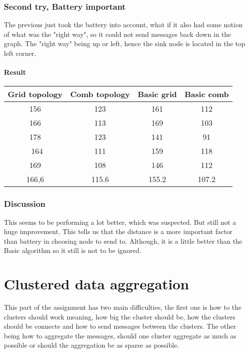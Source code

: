 \documentclass{article}
\begin{document}
\section{Second try, Battery important}
  The previous just took the battery into account, what if it also had
  some notion of what was the "right way", so it could not send messages
  back down in the graph. The "right way" being up or left, hence the sink
  node is located in the top left corner.
  \subsection{Result}
    \begin{tabular}{c|c||c|c}
      Grid topology & Comb topology & Basic grid & Basic comb\\
      \hline
      \hline
      156 & 123 & 161 & 112\\
      166 & 113 & 169 & 103\\
      178 & 123 & 141 & 91\\\
      164 & 111 & 159 & 118\\
      169 & 108 & 146 & 112\\
      \hline
      166,6&115.6&155.2&107.2\\
    \end{tabular}
    \section{Discussion}
     This seems to be performing a lot better, which was suspected. But still not a huge
     improvement. This tells us that the distance is a more important factor than battery
     in choosing node to send to. Although, it is a little better than the Basic algorithm
     so it still is not to be ignored.
     
\part{Clustered data aggregation}
  This part of the assignment has two main difficulties, the first one is 
  how to the clusters should work meaning, how big the cluster should be, how the clusters
  should be connecte and how to send messages between the clusters.
  The other being how to aggregate the messages, should one cluster aggregate as much
  as possible or should the aggregation be as sparse as possible.
\end{document}

